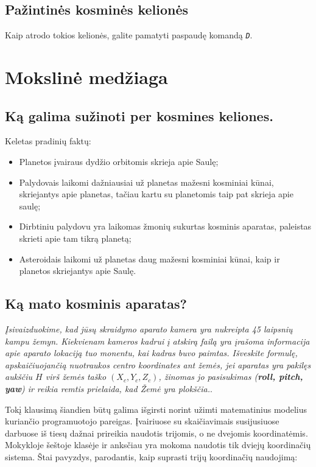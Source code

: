 \documentclass[a4paper]{article}
\begin{document}
 \subsection*{Pažintinės kosminės kelionės}
 
Kaip atrodo tokios kelionės, galite pamatyti paspaudę komandą \texttt{\textit{D}}.

\section*{Mokslinė medžiaga}
\subsection*{Ką galima sužinoti per kosmines keliones.}
Keletas pradinių faktų:
\begin{itemize}
\item Planetos įvairaus dydžio orbitomis skrieja apie Saulę;
\item Palydovais laikomi dažniausiai už planetas mažesni kosminiai kūnai, skriejantys apie planetas, tačiau kartu su planetomis taip pat skrieja apie saulę;
\item Dirbtiniu palydovu yra laikomas žmonių sukurtas kosminis aparatas, paleistas skrieti apie tam tikrą planetą;
\item Asteroidais laikomi už planetas daug mažesni kosminiai kūnai, kaip ir planetos skriejantys apie Saulę. 
\end{itemize}
\subsection*{Ką mato kosminis aparatas?}

\textit{Įsivaizduokime, kad jūsų skraidymo aparato kamera yra nukreipta 45 laipsnių kampu žemyn. Kiekvienam kameros kadrui į atskirą failą yra įrašoma informacija apie aparato lokaciją tuo monentu, kai kadras buvo paimtas. Išveskite formulę, apskaičiuojančią nuotraukos centro koordinates ant žemės, jei aparatas yra pakilęs aukščiu $H$ virš žemės taško $(X_c, Y_c, Z_c)$,  žinomas jo pasisukimas (\textbf{roll, pitch, yaw}) ir reikia remtis prielaida, kad Žemė yra plokščia.}.

Tokį klausimą šiandien būtų galima išgirsti norint užimti matematinius modelius kuriančio programuotojo pareigas. Įvairiuose su skaičiavimais susijusiuose darbuose iš tiesų dažnai prireikia naudotis trijomis, o ne dvejomis koordinatėmis. Mokykloje šeštoje klasėje ir anksčiau yra mokoma naudotis tik dviejų koordinačių sistema. Štai pavyzdys, parodantis, kaip suprasti trijų koordinačių naudojimą:
\end{document}
